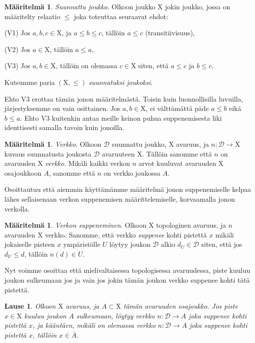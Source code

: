 \documentclass[12pt,a4paper,leqno]{report}
\newcommand{\X}{\mathrm{X}}
\newcommand{\D}{\mathcal{D}}
\newcommand{\verkop}{\leq}
\theoremstyle{plain}
\newtheorem{lause}[equation]{Lause}
\theoremstyle{definition}
\newtheorem{maar}[equation]{Määritelmä}
\theoremstyle{remark}
\begin{document}
\begin{maar}\label{suunjoukmaar}
\emph{Suunnattu joukko}. Olkoon joukko $\X$ jokin joukko, jossa on määritelty relaatio $\verkop$ joka toteuttaa seuraavat ehdot:

(V1) Jos $a, b, c \in \X$, ja $a \verkop b \verkop c$, tällöin $a \verkop c$ (transitiivisuus),

(V2) Jos $a \in \X$, tällöin $a \verkop a$,

(V3) Jos $a, b \in \X$, tällöin on olemassa $c \in \X$ siten, että $a \verkop c$ ja $b \verkop c$.

Kutsumme paria $(\X, \verkop)$ \emph{suunnatuksi joukoksi}.
\end{maar}

Ehto V3 erottaa tämän jonon määritelmästä. Toisin kuin luonnollisilla luvuilla, järjestyksemme on vain osittainen. Jos $a, b \in \X$, ei välttämättä päde $a \verkop b$ eikä $b \verkop a$. Ehto V3 kuitenkin antaa meille keinon puhua suppenemisesta liki identtisesti samalla tavoin kuin jonoilla.

\begin{maar}\label{verkmaar}
\emph{Verkko}. Olkoon $\D$ suunnattu joukko, $\X$ avaruus, ja $n : \D \to \X$ kuvaus suunnatusta joukosta $\D$ avaruuteen $\X$. Tällöin sanomme että $n$ on avaruuden $\X$ \emph{verkko}. Mikäli kaikki verkon $n$ arvot kuuluvat avaruuden $\X$ osajoukkoon $A$, sanomme että $n$ on verkko joukossa $A$.
\end{maar}

Osoittautuu että aiemmin käyttämämme määritelmä jonon suppenemiselle kelpaa lähes sellaisenaan verkon suppenemisen määrittelemiselle, korvaamalla jonon verkolla.

\begin{maar}\label{verksupmaar}
\emph{Verkon suppeneminen}. Olkoon $\X$ topologinen avaruus, ja $n$ avaruuden $\X$ verkko. Sanomme, että verkko \emph{suppenee} kohti pistettä $x$ mikäli jokaiselle pisteen $x$ ympäristölle $U$ löytyy joukon $\D$ alkio $d_U \in \D$ siten, että jos $d_U \verkop d$, tällöin $n(d) \in U$.
\end{maar}

Nyt voimme osoittaa että mielivaltaisessa topologisessa avaruudessa, piste kuuluu joukon sulkeumaan jos ja vain jos jokin tämän joukon verkko suppenee kohti tätä pistettä.

\begin{lause}\label{verksulklause}
Olkoon $\X$ avaruus, ja $A \subset \X$ tämän avaruuden osajoukko. Jos piste $x \in \X$ kuuluu joukon $A$ sulkeumaan, löytyy verkko $n : \D \to A$ joka suppenee kohti pistettä $x$, ja kääntäen, mikäli on olemassa verkko $n : \D \to A$ joka suppenee kohti pistettä $x$, tällöin $x \in \overline{A}$.
\end{lause}
\end{document}
